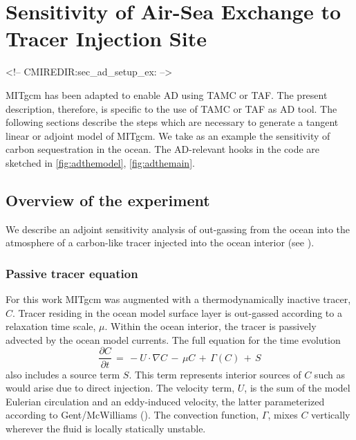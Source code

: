 
\section{Sensitivity of Air-Sea Exchange to Tracer Injection Site }
\label{www:tutorials}
\label{sect:eg-simple-tracer-adjoint}
\label{sec_ad_setup_ex}
\label{sect:tutorialIII}
\begin{rawhtml}
<!-- CMIREDIR:sec_ad_setup_ex: -->
\end{rawhtml}

MITgcm has been adapted to enable AD using TAMC or TAF.
The present description, therefore, is specific to the
use of TAMC or TAF as AD tool.
The following sections describe the steps which are necessary to 
generate a tangent linear or adjoint model of MITgcm.
We take as an example the sensitivity of carbon sequestration
in the ocean.
The AD-relevant hooks in the code are sketched in 
\ref{fig:adthemodel}, \ref{fig:adthemain}.

\subsection{Overview of the experiment}
\label{www:tutorials}

We describe an adjoint sensitivity analysis of out-gassing from 
the ocean into the atmosphere of a carbon-like tracer injected
into the ocean interior (see \cite{hil-eta:01}).

\subsubsection{Passive tracer equation}
\label{www:tutorials}

For this work MITgcm was augmented with a thermodynamically 
inactive tracer, $C$. Tracer residing in the ocean 
model surface layer is out-gassed according to a relaxation time scale, 
$\mu$. Within the ocean interior, the tracer is passively advected 
by the ocean model currents. The full equation for the time evolution
%
\begin{equation}
\label{carbon_ddt}
\frac{\partial C}{\partial t} \, = \, 
-U\cdot \nabla C \, - \, \mu C \, + \, \Gamma(C) \,+ \, S
\end{equation}
%
also includes a source term $S$. This term 
represents interior sources of $C$ such as would arise due to
direct injection.
The velocity term, $U$, is the sum of the
model Eulerian circulation and an eddy-induced velocity, the latter
parameterized according to Gent/McWilliams 
(\cite{gen-mcw:90, gen-eta:95}).
The convection function, $\Gamma$, mixes $C$ vertically wherever the 
fluid is locally statically unstable. 

